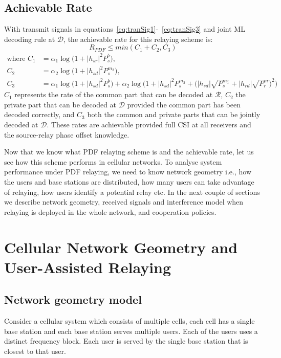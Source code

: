 \subsection{Achievable Rate}
With transmit signals in equations~\ref{eq:tranSig1}-~\ref{eq:tranSig3} and joint ML decoding rule at $\mathcal{D}$, the achievable rate for this relaying scheme is:
\begin{equation} \label{eq:rate}
R_{PDF} \leq min(C_1+C_2,C_3)
\end{equation}
\begin{align}
\text{where } C_1 &= \alpha_1 \log\Big(1+|h_{sr}|^2P_s^b\Big),\\
C_2 &= \alpha_2 \log\Big(1+|h_{sd}|^2P_s^{m_2}\Big),\\
C_3 &= \alpha_1 \log\Big(1+|h_{sd}|^2P_s^b\Big) + \alpha_2\log\bigg(1+|h_{sd}|^2P_s^{m_2} + \Big(|h_{sd}|\sqrt{P_s^{m_1}} + |h_{rd}|\sqrt{P_r^m}\Big)^2\bigg)
\end{align}
$C_1$ represents the rate of the common part that can be decoded at $\mathcal{R}$, $C_2$  the private part that can be decoded at $\mathcal{D}$ provided the common part has been decoded correctly, and $C_3$ both the common and private parts that can be jointly decoded at $\mathcal{D}$. These rates are achievable provided full CSI at all receivers and the source-relay phase offset knowledge.
\par
Now that we know what PDF relaying scheme is and the achievable rate, let us see how this scheme performs in cellular networks. To analyse system performance under PDF relaying, we need to know network geometry i.e., how the users and base stations are distributed, how many users can take advantage of relaying, how users identify a potential relay etc. In the next couple of sections we describe network geometry,  received signals and interference model when relaying is deployed in the whole network, and cooperation policies.

\section{Cellular Network Geometry and User-Assisted Relaying}

\subsection{Network geometry model}
Consider a cellular system which consists of multiple
cells, each cell has a single base station and each base station
serves multiple users. Each of the users uses a distinct frequency
block. Each user is served by the single base station that
is closest to that user.


